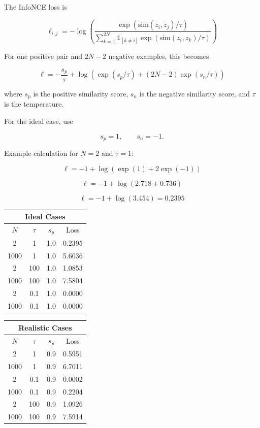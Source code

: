 \documentclass[10pt]{article}
\begin{document}
The InfoNCE loss is

\[
\ell_{i,j}
=
-\log
\left(
\frac{
	\exp\left(\mathrm{sim}(z_i,z_j)/\tau\right)
}{
	\sum_{k=1}^{2N}\mathbb{1}_{[k \neq i]}
	\exp\left(\mathrm{sim}(z_i,z_k)/\tau\right)
}
\right)
\]

For one positive pair and $2N-2$ negative examples, this becomes

\[
\ell
=
-\frac{s_p}{\tau}
+
\log
\left(
\exp(s_p/\tau)
+
(2N-2)\exp(s_n/\tau)
\right)
\]

where $s_p$ is the positive similarity score, $s_n$ is the negative similarity score, and $\tau$ is the temperature.

For the ideal case, use

\[
s_p = 1, \qquad s_n = -1.
\]

Example calculation for $N=2$ and $\tau=1$:

\[
\ell
=
-1
+
\log
\left(
\exp(1) + 2\exp(-1)
\right)
\]

\[
\ell
=
-1
+
\log(2.718 + 0.736)
\]

\[
\ell
=
-1 + \log(3.454)
=
0.2395
\]

\begin{center}
	\begin{minipage}[t]{0.48\textwidth}
		\centering
		\begin{tabular}{|c|c|c|c|}
			\hline
			\multicolumn{4}{|c|}{\textbf{Ideal Cases}} \\
			\hline
			$N$ & $\tau$ & $s_p$ & Loss \\
			\hline
			2 & 1 & 1.0 & 0.2395 \\
			1000 & 1 & 1.0 & 5.6036 \\
			2 & 100 & 1.0 & 1.0853 \\
			1000 & 100 & 1.0 & 7.5804 \\
			2 & 0.1 & 1.0 & 0.0000 \\
			1000 & 0.1 & 1.0 & 0.0000 \\
			\hline
		\end{tabular}
	\end{minipage}
	\hfill
	\begin{minipage}[t]{0.48\textwidth}
		\centering
		\begin{tabular}{|c|c|c|c|}
			\hline
			\multicolumn{4}{|c|}{\textbf{Realistic Cases}} \\
			\hline
			$N$ & $\tau$ & $s_p$ & Loss \\
			\hline
			2 & 1 & 0.9 & 0.5951 \\
			1000 & 1 & 0.9 & 6.7011 \\
			2 & 0.1 & 0.9 & 0.0002 \\
			1000 & 0.1 & 0.9 & 0.2204 \\
			2 & 100 & 0.9 & 1.0926 \\
			1000 & 100 & 0.9 & 7.5914 \\
			\hline
		\end{tabular}
	\end{minipage}
\end{center}
\end{document}
